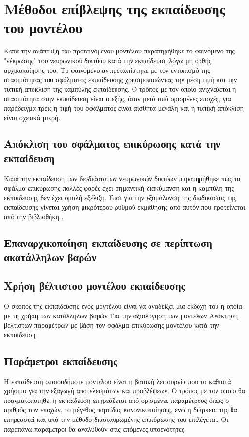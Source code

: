 \section{Μέθοδοι επίβλεψης της εκπαίδευσης του μοντέλου}
Κατά την ανάπτυξη του προτεινόμενου μοντέλου παρατηρήθηκε το φαινόμενο της "νέκρωσης" του νευρωνικού δικτύου κατά την εκπαίδευση λόγω μη ορθής αρχικοποίησης του. Το φαινόμενο αντιμετωπίστηκε με τον εντοπισμό της στασιμότητας του σφάλματος εκπαίδευσης χρησιμοποιώντας την μέση τιμή και την τυπική απόκλιση της καμπύλης εκπαίδευσης. Ο τρόπος με τον οποίο ανιχνεύεται η στασιμότητα στην εκπαίδευση είναι ο εξής, όταν μετά από ορισμένες εποχές, για παράδειγμα τρεις η τιμή του σφάλματος είναι αισθητά μεγάλη και η τυπική απόκλιση είναι σχετικά μικρή.

\subsection{Απόκλιση του σφάλματος επικύρωσης  κατά την εκπαίδευση}
Κατά την εκπαίδευση των δισδιάστατων νευρωνικών δικτύων παρατηρήθηκε πως το σφάλμα επικύρωσης πολλές φορές έχει σημαντική διακύμανση και η καμπύλη της εκπαίδευσης δεν έχει ομαλή εξέλιξη. Έτσι για την εξομάλυνση της διαδικασίας της εκπαίδευσης γίνεται χρήση μικρότερου ρυθμού εκμάθησης  από αυτόν που προτείνεται από την βιβλιοθήκη .

\subsection{Επαναρχικοποίηση εκπαίδευσης σε περίπτωση ακατάλληλων βαρών}


\subsection{Χρήση βέλτιστου μοντέλου εκπαίδευσης}
Ο σκοπός της εκπαίδευσης ενός μοντέλου είναι να αναδείξει μια εκδοχή του η οποία με τη χρήση των κατάλληλων βαρών 
Για την αξιολόγηση των μοντέλων
Ανάκτηση βέλτιστων παραμέτρων με βάση τον σφάλμα επικύρωσης
 μοντέλου κατά την εκπαίδευση

\subsection{Παράμετροι εκπαίδευσης}
Η εκπαίδευση οποιουδήποτε μοντέλου είναι η βασική λειτουργία που το καθιστά χρήσιμο για την εξαγωγή αποτελεσμάτων και προβλέψεων. Ο τρόπος με τον οποίο θα πραγματοποιηθεί η εκπαίδευση επηρεάζεται από ορισμένες παραμέτρους όπως ο αριθμός των εποχών, το μέγεθος παρτίδας κανονικοποίησης, ενώ η διάρκεια της θα επηρεαστεί και από την μέθοδο διασταυρωμένης επικύρωσης του επιλέγεται. Οι παραπάνω παράμετροι θα αναλυθούν στις επόμενες υποενότητες.

